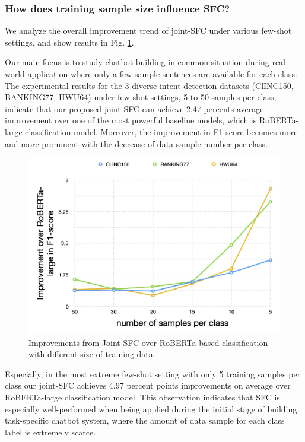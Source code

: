 \subsubsection*{How does training sample size influence SFC?} 
We analyze the overall  improvement  trend  of  joint-SFC under various few-shot
settings, and show results in Fig. \ref{fig:trend}.

Our main focus  is  to  study  chatbot  building  in common situation during real-world
application  where  only  a few sample sentences are available for each class.
The  experimental  results  for  the  3  diverse  intent detection datasets
(ClINC150,  BANKING77,  HWU64)  under  few-shot  settings, 5 to 50 samples per
class,  indicate that our proposed joint-SFC can achieve 2.47 percents average
improvement   over  one  of  the  most  powerful  baseline  models,  which  is
RoBERTa-large  classification  model.  Moreover,  the  improvement  in F1 score
becomes  more  and  more prominent with the decrease of data sample number per
class.

\begin{figure}[t]
  \begin{centering}
    \includegraphics[scale=0.2]{picture/improvement_trend.jpg} 
    \par
  \end{centering}
  \caption{
    Improvements  from  Joint  SFC  over  RoBERTa  based  classification  with
    different size of training data.
  }
  \label{fig:trend}
\end{figure}

Especially,  in the most extreme few-shot setting with only 5 training samples
per  class  our joint-SFC achieves 4.97 percent points improvements on average
over  RoBERTa-large classification model. This observation indicates that SFC
is  especially  well-performed  when being applied during the initial stage of
building  task-specific  chatbot  system,  where the amount of data sample for
each class label is extremely scarce.

